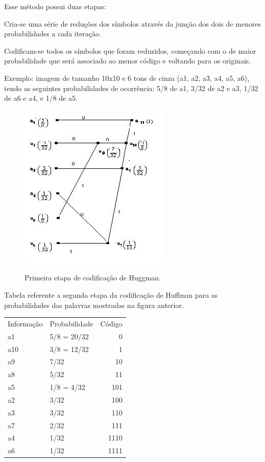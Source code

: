 Esse método possui duas etapas:

\begin{alineas}
    \item Cria-se uma série de reduções dos símbolos através da junção dos dois de menores probabilidades a cada iteração.
    \item Codificam-se todos os símbolos que foram reduzidos, começando com o de maior probabilidade que será associado ao menor código e voltando para os originais.
\end{alineas}

Exemplo: imagem de tamanho 10x10 e 6 tons de cinza (a1, a2, a3, a4, a5, a6), tendo as seguintes probabilidades de ocorrência: 5/8 de a1, 3/32 de a2 e a3, 1/32 de a6 e a4, e 1/8 de a5.

\begin{figure}[h]
\caption{\small Primeira etapa de codificação de Huggman.}
\centering
\includegraphics[scale=0.50]{figs/huffman_etapa1.jpg}
\label{f.huffmanetapa1}
\end{figure}

Tabela referente a segunda etapa da codificação de Huffman para as probabilidades das palavras mostradas na figura anterior.

\begin{table}[]
\begin{tabular}{llr}
Informação & Probabilidade & Código \\
a1         & 5/8 = 20/32   & 0      \\
a10        & 3/8 = 12/32   & 1      \\
a9         & 7/32          & 10     \\
a8         & 5/32          & 11     \\
a5         & 1/8 = 4/32    & 101    \\
a2         & 3/32          & 100    \\
a3         & 3/32          & 110    \\
a7         & 2/32          & 111    \\
a4         & 1/32          & 1110   \\
a6         & 1/32          & 1111
\end{tabular}
\end{table}

